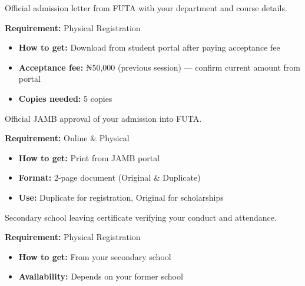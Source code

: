 \documentclass[11pt,a4paper]{article}
\begin{document}
\begin{tcolorbox}[colback=lightGray,colframe=primary,title={\color{white}\textbf{�� FUTA Admission Letter}},colbacktitle=primary,arc=4pt,breakable]
Official admission letter from FUTA with your department and course details.

\textbf{Requirement:} \textcolor{dangerRed}{Physical Registration}

\begin{itemize}[leftmargin=1em, itemsep=0.2em]
    \item \textbf{How to get:} Download from student portal after paying acceptance fee
    \item \textbf{Acceptance fee:} ₦50,000 (previous session) --- confirm current amount from portal
    \item \textbf{Copies needed:} 5 copies
\end{itemize}
\end{tcolorbox}

\begin{tcolorbox}[colback=lightGray,colframe=primary,title={\color{white}\textbf{�� JAMB Admission Letter}},colbacktitle=primary,arc=4pt,breakable]
Official JAMB approval of your admission into FUTA.

\textbf{Requirement:} \textcolor{successGreen}{Online \& Physical}

\begin{itemize}[leftmargin=1em, itemsep=0.2em]
    \item \textbf{How to get:} Print from JAMB portal
    \item \textbf{Format:} 2-page document (Original \& Duplicate)
    \item \textbf{Use:} Duplicate for registration, Original for scholarships
\end{itemize}
\end{tcolorbox}

\begin{tcolorbox}[colback=lightGray,colframe=primary,title={\color{white}\textbf{�� Testimonial}},colbacktitle=primary,arc=4pt,breakable]
Secondary school leaving certificate verifying your conduct and attendance.

\textbf{Requirement:} \textcolor{dangerRed}{Physical Registration}

\begin{itemize}[leftmargin=1em, itemsep=0.2em]
    \item \textbf{How to get:} From your secondary school
    \item \textbf{Availability:} Depends on your former school
\end{itemize}
\end{tcolorbox}
\end{document}
